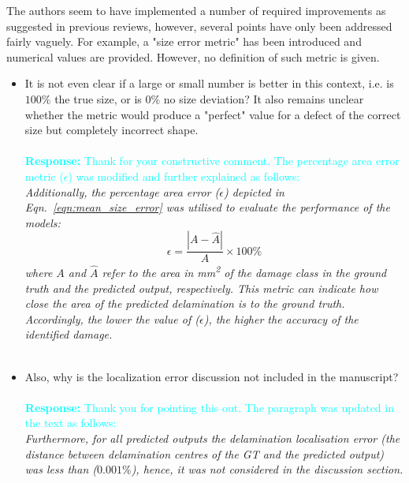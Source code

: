 \documentclass[11pt,a2paper]{report}
\begin{document}
	The authors seem to have implemented a number of required improvements as suggested in previous reviews, however, several points have only been addressed fairly vaguely. 
	For example, a "size error metric" has been introduced and numerical values are provided. 
	However, no definition of such metric is given. 
	\begin{itemize}
		\item It is not even clear if a large or small number is better in this context, i.e. is \(100\%\) the true size, or is \(0\%\) no size deviation? It also remains unclear whether the metric would produce a "perfect" value for a defect of the correct size but completely incorrect shape. 
			\\ \\
		\textcolor{Cyan}{
			\textbf{Response: }
			Thank for your constructive comment.
			The percentage area error metric (\(\epsilon\)) was modified and further explained as follows:\\	}
		\emph{Additionally, the percentage area error ($\epsilon$) depicted in Eqn.~\ref{eqn:mean_size_error} was utilised to evaluate the performance of the models:
	\begin{equation}\tag{8}
		\epsilon=\frac{|A-\hat{A}|}{A} \times 100\%
		\label{eqn:mean_size_error}
	\end{equation}
	where \(A\) and \(\hat{A}\) refer to the area in mm\textsuperscript{2} of the damage class in the ground truth and the predicted output, respectively.
	This metric can indicate how close the area of the predicted delamination is to the ground truth.
	Accordingly, the lower the value of ($\epsilon$), the higher the accuracy of the identified damage.}	
		\\ \\
		\item Also, why is the localization error discussion not included in the manuscript?
			\\ \\
		\textcolor{Cyan}{
			\textbf{Response:}
		Thank you for pointing this out. The paragraph was updated in the text as follows:}\\
		\emph{Furthermore, for all predicted outputs the delamination localisation error (the distance between delamination centres of the GT and the predicted output) was less than (\(0.001\%\)), hence, it was not considered in the discussion section.}
		\\ \\
	\end{itemize}
	
\end{document}
